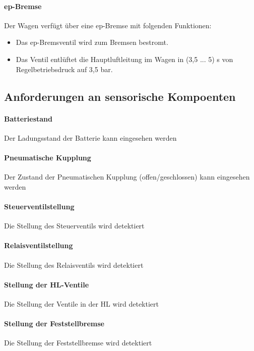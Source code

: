 \paragraph{ep-Bremse}
\begin{feat}
Der Wagen verfügt über eine ep-Bremse mit folgenden Funktionen:
\begin{itemize}
    \item Das ep-Bremsventil wird zum Bremsen bestromt.
    \item Das Ventil entlüftet die Hauptluftleitung im Wagen in (3,5 ... 5) s von Regelbetriebsdruck auf 3,5 bar.
\end{itemize}
\end{feat}


\subsection{Anforderungen an sensorische Kompoenten}

\paragraph{Batteriestand}
Der Ladungsstand der Batterie kann eingesehen werden
\paragraph{Pneumatische Kupplung}
Der Zustand der Pneumatischen Kupplung (offen/geschlossen) kann eingesehen werden
\paragraph{Steuerventilstellung}
Die Stellung des Steuerventils wird detektiert
\paragraph{Relaisventilstellung}
Die Stellung des Relaisventils wird detektiert
\paragraph{Stellung der HL-Ventile}
Die Stellung der Ventile in der HL wird detektiert
\paragraph{Stellung der Feststellbremse}
Die Stellung der Feststellbremse wird detektiert
